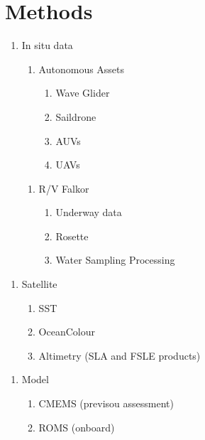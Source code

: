 \section{Methods}

\begin{enumerate}
    \item In situ data
    \begin{enumerate}
        \item Autonomous Assets
            \begin{enumerate}
            \item Wave Glider
            \item Saildrone
            \item AUVs
            \item UAVs
            \end{enumerate}
    \end{enumerate}

    \begin{enumerate}
        \item R/V Falkor
            \begin{enumerate}
            \item Underway data
            \item Rosette 
            \item Water Sampling Processing
            \end{enumerate}
    \end{enumerate}
\end{enumerate}

\begin{enumerate}
    \item Satellite
    \begin{enumerate}
        \item SST
        \item OceanColour
        \item Altimetry (SLA and FSLE products)
    \end{enumerate}
 \end{enumerate}

\begin{enumerate}
    \item Model
    \begin{enumerate}
        \item CMEMS (previsou assessment)
        \item ROMS (onboard)
    \end{enumerate}
 \end{enumerate}